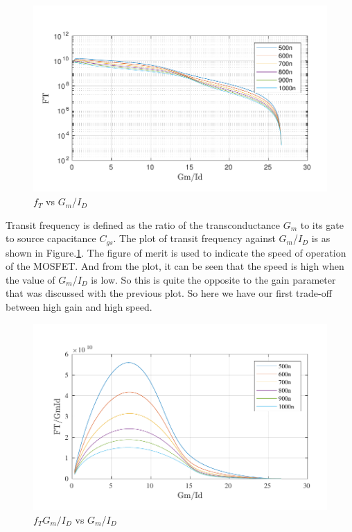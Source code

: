 \begin{figure} [H]
\centering
\includegraphics[scale=1]{Figures/Misc/PDFs/nmos_len_gmidft.pdf}
\caption{$f_T$ vs $G_m$/$I_D$}
\label{fig:gmidft}
\end{figure}

Transit frequency is defined as the ratio of the transconductance $G_m$ to its gate to source capacitance $C_{gs}$. The plot of transit frequency against $G_m$/$I_D$ is as shown in Figure.\ref{fig:gmidft}. The figure of merit is used to indicate the speed of operation of the MOSFET. And from the plot, it can be seen that the speed is high when the value of $G_m$/$I_D$ is low. So this is quite the opposite to the gain parameter that was discussed with the previous plot. So here we have our first trade-off between high gain and high speed.

\begin{figure} [H]
\centering
\includegraphics[scale=1]{Figures/Misc/PDFs/nmos_len_gmidftgmid.pdf}
\caption{$f_TG_m/I_D$ vs $G_m$/$I_D$}
\label{fig:gmidftgmid}
\end{figure}

